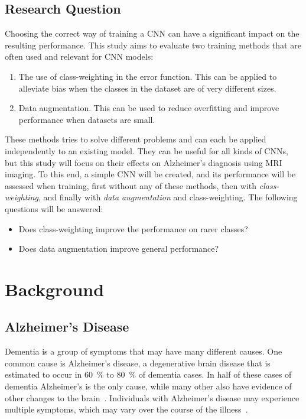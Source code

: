 \documentclass{kththesis}
\begin{document}
\section{Research Question}
Choosing the correct way of training a CNN can have a significant impact on the resulting performance. This study aims to evaluate two training methods that are often used and relevant for CNN models:
\begin{enumerate}
	\item{The use of class-weighting in the error function. This can be applied to alleviate bias when the classes in the dataset are of very different sizes.}
	\item{Data augmentation. This can be used to reduce overfitting and improve performance when datasets are small.}
\end{enumerate}
These methods tries to solve different problems and can each be applied independently to an existing model. They can be useful for all kinds of CNNs, but this study will focus on their effects on Alzheimer's diagnosis using MRI imaging. To this end, a simple CNN will be created, and its performance will be assessed when training, first without any of these methods, then with \textit{class-weighting}, and finally with \textit{data augmentation} and class-weighting. The following questions will be answered:

\begin{itemize}
\item{Does class-weighting improve the performance on rarer classes?}
\item{Does data augmentation improve general performance?}
\end{itemize}

\chapter{Background}

\section{Alzheimer's Disease}

Dementia is a group of symptoms that may have many different causes. One common cause is Alzheimer's disease, a degenerative brain disease that is estimated to occur in 60~\% to 80~\% of dementia cases. In half of these cases of dementia Alzheimer's is the only cause, while many other also have evidence of other changes to the brain~\cite{factsfigures2018}.
Individuals with Alzheimer's disease may experience multiple symptoms, which may vary over the course of the illness~\cite{factsfigures2018}.
\end{document}
